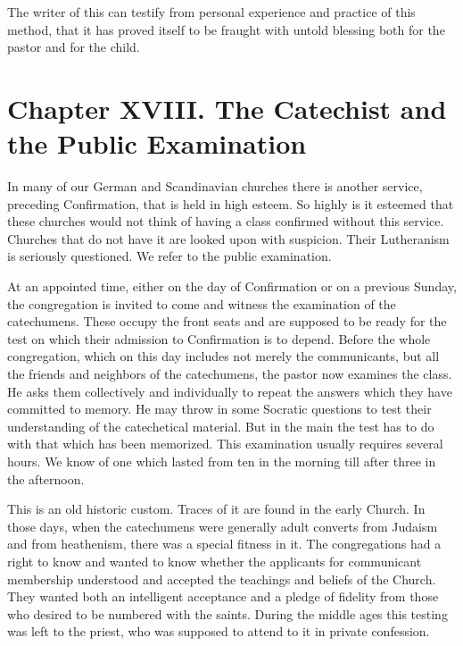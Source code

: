 The writer of this can testify from personal experience and practice of this method, that it has proved itself to be fraught with untold blessing both for the pastor and for the child.

\chapter[Chapter XVIII. The Public Examination]{Chapter XVIII. The Catechist and the Public Examination}

In many of our German and Scandinavian churches there is another service, preceding Confirmation, that is held in high esteem. So highly is it esteemed that these churches would not think of having a class confirmed without this service. Churches that do not have it are looked upon with suspicion. Their Lutheranism is seriously questioned. We refer to the public examination. 

 At an appointed time, either on the day of Confirmation or on a previous Sunday, the congregation is invited to come and witness the examination of the catechumens. These occupy the front seats and are supposed to be ready for the test on which their admission to Confirmation is to depend. Before the whole congregation, which on this day includes not merely the communicants, but all the friends and neighbors of the catechumens, the pastor now examines the class. He asks them collectively and individually to repeat the answers which they have committed to memory. He may throw in some Socratic questions to test their understanding of the catechetical material. But in the main the test has to do with that which has been memorized. This
examination usually requires several hours. We know of one which lasted from ten in the morning till after three in the afternoon. 

 This is an old historic custom. Traces of it are found in the early Church. In those days, when the catechumens were generally adult converts from Judaism and from heathenism, there was a special fitness in it. The congregations had a right to know and wanted to know whether the applicants for communicant membership understood and accepted the teachings and beliefs of the Church. They wanted both an intelligent acceptance and a pledge of fidelity from those who desired to be numbered with the saints. During the middle ages this testing was left to the priest, who was supposed to attend to it in private confession. 

